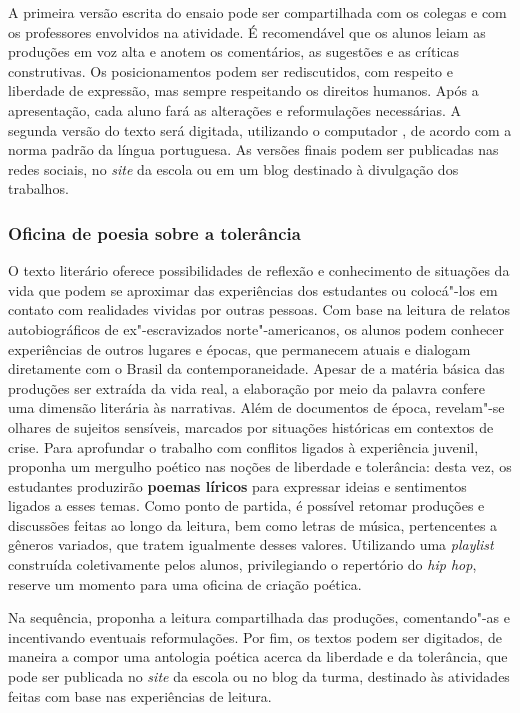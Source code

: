 \documentclass[12pt]{extarticle}
\begin{document}
A primeira versão escrita do ensaio pode ser compartilhada com os
colegas e com os professores envolvidos na atividade. É recomendável que
os alunos leiam as produções em voz alta e anotem os comentários, as
sugestões e as críticas construtivas. Os posicionamentos podem ser
rediscutidos, com respeito e liberdade de expressão, mas sempre
respeitando os direitos humanos. Após a apresentação, cada aluno fará as
alterações e reformulações necessárias. A segunda versão do texto será
digitada, utilizando o computador , de acordo com a norma padrão da
língua portuguesa. As versões finais podem ser publicadas nas redes
sociais, no \emph{site} da escola ou em um blog destinado à divulgação
dos trabalhos.

\subsubsection{Oficina de poesia sobre a tolerância}


O texto literário oferece possibilidades de reflexão e conhecimento de
situações da vida que podem se aproximar das experiências dos
estudantes ou colocá"-los em contato com realidades vividas por outras
pessoas. Com base na leitura de relatos autobiográficos de
ex"-escravizados norte"-americanos, os alunos podem conhecer
experiências de outros lugares e épocas, que permanecem atuais e
dialogam diretamente com o Brasil da contemporaneidade. Apesar de a
matéria básica das produções ser extraída da vida real, a elaboração
por meio da palavra confere uma dimensão literária às narrativas. Além
de documentos de época, revelam"-se olhares de sujeitos sensíveis,
marcados por situações históricas em contextos de crise. Para
aprofundar o trabalho com conflitos ligados à experiência juvenil,
proponha um mergulho poético nas noções de liberdade e tolerância:
desta vez, os estudantes produzirão \textbf{poemas líricos} para
expressar ideias e sentimentos ligados a esses temas. Como ponto de
partida, é possível retomar produções e discussões feitas ao longo da
leitura, bem como letras de música, pertencentes a gêneros variados,
que tratem igualmente desses valores. Utilizando uma \emph{playlist}
construída coletivamente pelos alunos, privilegiando o repertório do
\emph{hip hop}, reserve um momento para uma oficina de criação
poética. 


Na sequência, proponha a leitura compartilhada das produções,
comentando"-as e incentivando eventuais reformulações. Por fim, os
textos podem ser digitados, de maneira a compor uma antologia poética
acerca da liberdade e da tolerância, que pode ser publicada no
\emph{site} da escola ou no blog da turma, destinado às atividades
feitas com base nas experiências de leitura.
\end{document}

